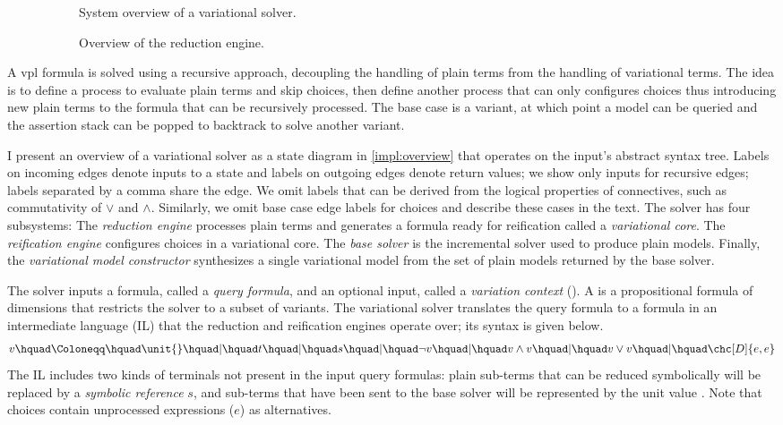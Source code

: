 \begin{figure}
  \begin{subfigure}[t]{0.5\linewidth}
    
    \vspace{3.5ex}
    \caption{System overview of a variational solver.}%
    \label{impl:overview}
  \end{subfigure}
  \begin{subfigure}[t]{0.5\linewidth}
    
    \caption{Overview of the reduction engine.}
    \label{impl:vcore}
  \end{subfigure}
  \caption{}
\end{figure}

A \ac{vpl} formula is solved using a recursive approach, decoupling the handling
of plain terms from the handling of variational terms. The idea is to define a
process to evaluate plain terms and skip choices, then define another process
that can only configures choices thus introducing new plain terms to the formula
that can be recursively processed. The base case is a variant, at which point a
model can be queried and the assertion stack can be popped to backtrack to solve
another variant.

I present an overview of a variational solver as a state diagram in
\autoref{impl:overview} that operates on the input's abstract syntax tree.
Labels on incoming edges denote inputs to a state and labels on outgoing edges
denote return values; we show only inputs for recursive edges; labels separated
by a comma share the edge. We omit labels that can be derived from the logical
properties of connectives, such as commutativity of $\vee$ and $\wedge$.
Similarly, we omit base case edge labels for choices and describe these cases in
the text. The solver has four subsystems: The \emph{reduction engine} processes
plain terms and generates a formula ready for reification called a
\emph{variational core}. The \emph{reification engine} configures choices in a
variational core. The \textit{base solver} is the incremental solver used to
produce plain models. Finally, the \emph{variational model constructor}
synthesizes a single variational model from the set of plain models returned by
the base solver.

The solver inputs a \vpl{} formula, called a \emph{query formula}, and an
optional input, called a \emph{variation context} (\vc{}). A \vc{} is a
propositional formula of dimensions that restricts the solver to a subset of
variants.
%
The variational solver translates the query formula to a formula in an
intermediate language (IL) that the reduction and reification engines operate
over; its syntax is given below.
%
\[
  v \hquad\Coloneqq\hquad \unit{}
  \hquad|\hquad t
  \hquad|\hquad s
  \hquad|\hquad \neg v
  \hquad|\hquad v \wedge v
  \hquad|\hquad v \vee v
  \hquad|\hquad \chc[D]{e,e}
\]
%
The IL includes two kinds of terminals not present in the input query formulas:
plain sub-terms that can be reduced symbolically will be replaced by a
\emph{symbolic reference} $s$, and sub-terms that have been sent to the base
solver will be represented by the unit value \unit{}.
%
Note that choices contain unprocessed expressions ($e$) as alternatives.


